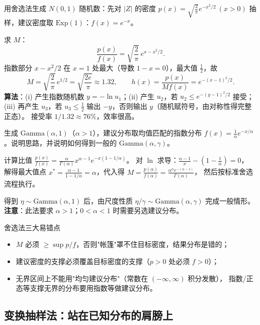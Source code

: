 \begin{exbox}[半正态法生成标准正态（重点）]
用舍选法生成 $N(0,1)$ 随机数：先对 $|Z|$ 的密度
$p(x)=\sqrt{\frac2\pi}e^{-x^2/2}\ (x>0)$ 抽样，建议密度取 $\mathrm{Exp}(1)$：$f(x)=e^{-x}$。
\end{exbox}
\begin{sol}
求 $M$：
\[
\frac{p(x)}{f(x)}=\sqrt{\frac2\pi}\,e^{x-x^2/2}.
\]
指数部分 $x-x^2/2$ 在 $x=1$ 处最大（导数 $1-x=0$），最大值 $\frac12$，故
\[
M=\sqrt{\frac2\pi}\,e^{1/2}=\sqrt{\frac{2e}{\pi}}\approx1.32,\qquad
h(x)=\frac{p(x)}{Mf(x)}=e^{-(x-1)^2/2}.
\]
\textbf{算法}：(i) 产生指数随机数 $y=-\ln u_1$；(ii) 产生 $u_2$，若
$u_2\le e^{-(y-1)^2/2}$ 接受；(iii) 再产生 $u_3$，若 $u_3\le\frac12$ 输出 $-y$，否则输出 $y$（随机赋符号，由对称性得完整正态）。
接受率 $1/1.32\approx76\%$，效率很高。
\end{sol}

\begin{exbox}
生成 $\mathrm{Gamma}(\alpha,1)$（$\alpha>1$），建议分布取均值匹配的指数分布
$f(x)=\frac1\alpha e^{-x/\alpha}$。说明思路，并说明如何得到一般的 $\mathrm{Gamma}(\alpha,\gamma)$。
\end{exbox}
\begin{sol}
计算比值 $\frac{p(x)}{f(x)}=\frac{\alpha}{\Gamma(\alpha)}x^{\alpha-1}e^{-x(1-1/\alpha)}$。
对 $\ln$ 求导：$\frac{\alpha-1}{x}-(1-\frac1\alpha)=0$，
解得最大值点 $x^*=\frac{\alpha-1}{1-1/\alpha}=\alpha$，代入得
$M=\frac{p(\alpha)}{f(\alpha)}=\frac{\alpha^{\alpha}e^{-(\alpha-1)}}{\Gamma(\alpha)}$，
然后按标准舍选流程执行。

得到 $\eta\sim\mathrm{Gamma}(\alpha,1)$ 后，由尺度性质 $\eta/\gamma\sim\mathrm{Gamma}(\alpha,\gamma)$ 完成一般情形。
\textbf{注意}：此法要求 $\alpha>1$；$0<\alpha<1$ 时需要另选建议分布。
\end{sol}

\begin{wbox}{舍选法三大易错点}
\begin{itemize}[leftmargin=2em]
  \item $M$ 必须 $\ge\sup p/f$，否则"帐篷"罩不住目标密度，结果分布是错的；
  \item 建议密度的支撑必须覆盖目标密度的支撑（$p>0$ 处必须 $f>0$）；
  \item 无界区间上不能用"均匀建议分布"（常数在 $(-\infty,\infty)$ 积分发散），
  指数/正态等支撑无界的分布要用指数等做建议分布。
\end{itemize}
\end{wbox}

\subsection{变换抽样法：站在已知分布的肩膀上}

